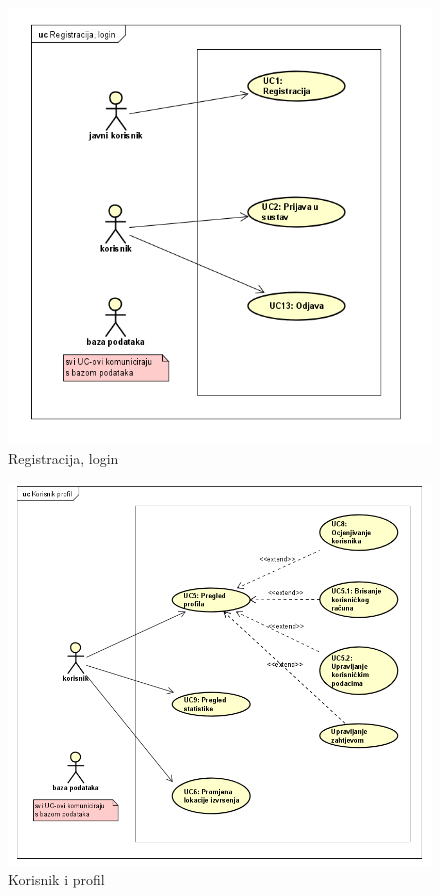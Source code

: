 				
					\begin{figure}[H]
					\includegraphics[scale=1.0]{slike/reg-log.png} %
					\centering
					\caption{Registracija, login}
				\end{figure}
				
				
					\begin{figure}[H]
					\includegraphics[scale=0.9]{slike/korisnik-profil.png} %
					\centering
					\caption{Korisnik i profil}
				\end{figure}
				
